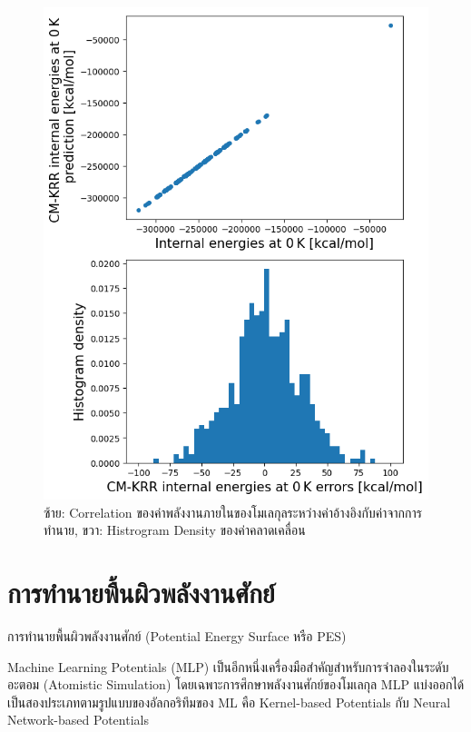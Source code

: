 \begin{figure}[htbp]
    \centering
    \includegraphics[width=0.8\linewidth]{fig/qm9_cm_kernel_corr.png}
    \caption{ซ้าย: Correlation ของค่าพลังงานภายในของโมเลกุลระหว่างค่าอ้างอิงกับค่าจากการทำนาย, ขวา: Histrogram Density 
    ของค่าคลาดเคลื่อน}
    \label{fig:qm9_cm_kernel_corr}
\end{figure}

\section{การทำนายพื้นผิวพลังงานศักย์}
\label{sec:pred_pot_ener}

การทำนายพื้นผิวพลังงานศักย์ (Potential Energy Surface หรือ PES)

Machine Learning Potentials (MLP) เป็นอีกหนึ่งเครื่องมือสำคัญสำหรับการจำลองในระดับอะตอม (Atomistic Simulation) 
โดยเฉพาะการศึกษาพลังงานศักย์ของโมเลกุล\autocite{behler2016,botu2017,brockherde2017,deringer2019,noe2020} 
MLP แบ่งออกได้เป็นสองประเภทตามรูปแบบของอัลกอริทึมของ ML คือ Kernel-based Potentials กับ Neural Network-based Potentials

